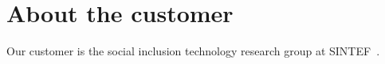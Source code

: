 \section{About the customer}

Our customer is the social inclusion technology research group at SINTEF~\cite{sintef}.

